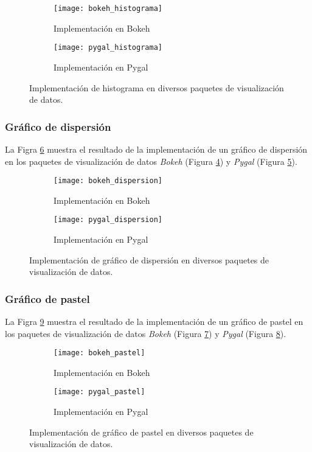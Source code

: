\begin{figure}[!htb]
	\centering
	\begin{subfigure}[b]{0.4\textwidth}
		\centering
		\texttt{[image: bokeh\_histograma]}
		\caption{Implementación en Bokeh}
		\label{Fig: BokehHistograma}
	\end{subfigure}
	\begin{subfigure}[b]{0.4\textwidth}
		\centering
		\texttt{[image: pygal\_histograma]}
		\caption{Implementación en Pygal}
		\label{Fig: PygalHistograma}
	\end{subfigure}
	\caption{Implementación de histograma en diversos paquetes de visualización de datos.}
	\label{Fig: Histograma}
\end{figure}

\subsubsection{Gráfico de dispersión}
La Figra \ref{Fig: Dispersion} muestra el resultado de la implementación de un gráfico de dispersión en los paquetes de visualización de datos \emph{Bokeh} (Figura \ref{Fig: BokehDispersion}) y \emph{Pygal} (Figura \ref{Fig: PygalDispersion}).

\begin{figure}[!htb]
	\centering
	\begin{subfigure}[b]{0.4\textwidth}
		\centering
		\texttt{[image: bokeh\_dispersion]}
		\caption{Implementación en Bokeh}
		\label{Fig: BokehDispersion}
	\end{subfigure}
	\begin{subfigure}[b]{0.4\textwidth}
		\centering
		\texttt{[image: pygal\_dispersion]}
		\caption{Implementación en Pygal}
		\label{Fig: PygalDispersion}
	\end{subfigure}
	\caption{Implementación de gráfico de dispersión en diversos paquetes de visualización de datos.}
	\label{Fig: Dispersion}
\end{figure}

\subsubsection{Gráfico de pastel}
La Figra \ref{Fig: Pastel} muestra el resultado de la implementación de un gráfico de pastel en los paquetes de visualización de datos \emph{Bokeh} (Figura \ref{Fig: BokehPastel}) y \emph{Pygal} (Figura \ref{Fig: PygalPastel}).

\begin{figure}[!htb]
	\centering
	\begin{subfigure}[b]{0.4\textwidth}
		\centering
		\texttt{[image: bokeh\_pastel]}
		\caption{Implementación en Bokeh}
		\label{Fig: BokehPastel}
	\end{subfigure}
	\begin{subfigure}[b]{0.4\textwidth}
		\centering
		\texttt{[image: pygal\_pastel]}
		\caption{Implementación en Pygal}
		\label{Fig: PygalPastel}
	\end{subfigure}
	\caption{Implementación de gráfico de pastel en diversos paquetes de visualización de datos.}
	\label{Fig: Pastel}
\end{figure}

